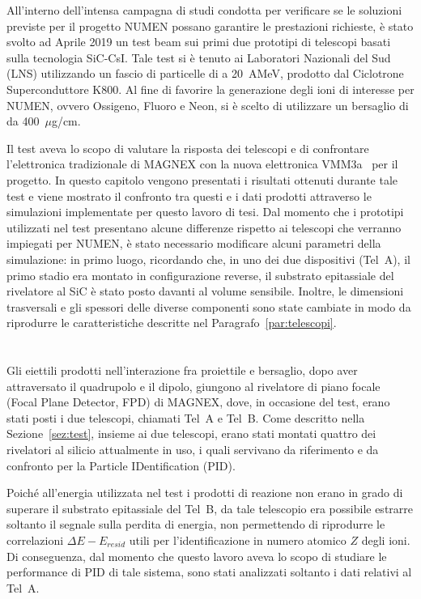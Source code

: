 
All'interno dell'intensa campagna di studi condotta per verificare se le soluzioni previste per il progetto NUMEN possano garantire le prestazioni richieste, è stato svolto ad Aprile 2019 un test beam sui primi due prototipi di telescopi basati sulla tecnologia SiC-CsI.
Tale test si è tenuto ai Laboratori Nazionali del Sud (LNS) utilizzando un fascio di particelle di  a 20~AMeV, prodotto dal Ciclotrone Superconduttore K800.
Al fine di favorire la generazione degli ioni di interesse per NUMEN, ovvero Ossigeno, Fluoro e Neon, si è scelto di utilizzare un bersaglio di  da 400~$\mu$g/cm.

Il test aveva lo scopo di valutare la risposta dei telescopi e di confrontare l'elettronica tradizionale di MAGNEX con la nuova elettronica VMM3a~\cite{degeronimo:ieee13} per il progetto.
In questo capitolo vengono presentati i risultati ottenuti durante tale test e viene mostrato il confronto tra questi e i dati prodotti attraverso le simulazioni implementate per questo lavoro di tesi. 
Dal momento che i prototipi utilizzati nel test presentano alcune differenze rispetto ai telescopi che verranno impiegati per NUMEN, è stato necessario modificare alcuni parametri della simulazione: in primo luogo, ricordando che, in uno dei due dispositivi (Tel~A), il primo stadio era montato in configurazione reverse, il substrato epitassiale del rivelatore al SiC è stato posto davanti al volume sensibile.
Inoltre, le dimensioni trasversali e gli spessori delle diverse componenti sono state cambiate in modo da riprodurre le caratteristiche descritte nel Paragrafo~\ref{par:telescopi}.


\section{}


Gli eiettili prodotti nell'interazione fra proiettile e bersaglio, dopo aver attraversato il quadrupolo e il dipolo, giungono al rivelatore di piano focale (Focal Plane Detector, FPD) di MAGNEX, dove, in occasione del test, erano stati posti i due telescopi, chiamati Tel~A e Tel~B. 
Come descritto nella Sezione~\ref{sez:test}, insieme ai due telescopi, erano stati montati quattro dei rivelatori al silicio attualmente in uso, i quali servivano da riferimento e da confronto per la Particle IDentification (PID).

Poiché all'energia utilizzata nel test i prodotti di reazione non erano in grado di superare il substrato epitassiale del Tel~B, da tale telescopio era possibile estrarre soltanto il segnale sulla perdita di energia, non permettendo di riprodurre le correlazioni $\Delta E - E_{resid}$ utili per l'identificazione in numero atomico $Z$ degli ioni.
Di conseguenza, dal momento che questo lavoro aveva lo scopo di studiare le performance di PID di tale sistema, sono stati analizzati soltanto i dati relativi al Tel~A.


